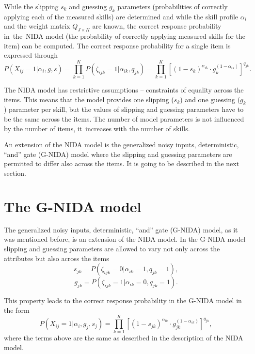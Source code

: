 \documentclass[english]{pwr_wmat_praca_dyplomowa}
\theoremstyle{plain}
\theoremstyle{definition}
\numberwithin{theorem}{chapter}
\begin{document}
\noindent While the slipping $s_k$ and guessing $g_k$ parameters (probabilities of correctly applying each of the measured skills) are determined and while the skill profile $\alpha_{i}$ and the weight matrix $Q_{J\times K}$ are known, the correct response probability in~the~NIDA model (the probability of correctly applying measured skills for the item) can be computed. The correct response probability for a single item is expressed through 
\begin{equation}
P(X_{ij} = 1 | \alpha_i, g, s) = \prod\limits_{k=1}^{K} P(\zeta_{ijk} = 1 | \alpha_{ik}, q_{jk}) = \prod\limits_{k=1}^{K} \left[ (1-s_k)^{\alpha_{ik}} \cdot g_k^{(1-\alpha_{ik})} \right] ^{q_{jk}}.
\end{equation}

The NIDA model has restrictive assumptions -- constraints of equality across the items. This means that the model provides one slipping ($s_k$) and one guessing ($g_k$) parameter per skill, but the values of slipping and guessing parameters have to be the same across the items. The number of model parameters is not influenced by the number of items, it~increases with the number of skills. 

An extension of the NIDA model is the generalized noisy inputs, deterministic, ``and'' gate (G-NIDA) model where the slipping and guessing parameters are permitted to differ also across the items. It is going to be described in the next section. 

\section{The G-NIDA model}

The generalized noisy inputs, deterministic, ``and'' gate (G-NIDA) model, as it was mentioned before, is an extension of the NIDA model. In the G-NIDA model slipping and guessing parameters are allowed to vary not only across the attributes but also across the items
\begin{equation}
s_{jk} = P(\zeta_{ijk} = 0 | \alpha_{ik} = 1, q_{jk} = 1),
\end{equation}
\begin{equation}
g_{jk} = P(\zeta_{ijk} = 1 | \alpha_{ik} = 0, q_{jk} = 1).
\end{equation}

\noindent This property leads to the correct response probability in the G-NIDA model in the form
\begin{equation}
P(X_{ij} = 1 | \alpha_i, g_j, s_j) = \prod\limits_{k=1}^{K} \left[ (1-s_{jk})^{\alpha_{ik}} \cdot g_{jk}^{(1-\alpha_{ik})} \right] ^{q_{jk}},
\end{equation}
where the terms above are the same as described in the description of the NIDA model.
 
\end{document}
